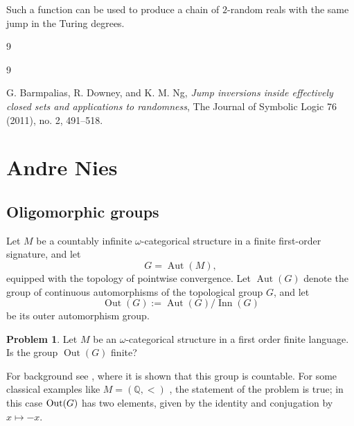 \documentclass[11pt]{amsart}
\theoremstyle{definition}
\newtheorem{problem}{Problem}[section]
\newcommand{\abstractauthor}[1]{\noindent\textbf{#1}\par\vspace{0.3\baselineskip}}
\begin{document}
Such a function can be used to produce a chain of $2$-random reals with
the same jump in the Turing degrees.

\vskip -10pt
\begin{bibentry}{9}
\begin{thebibliography}{9}

 G. Barmpalias, R. Downey, and K. M. Ng, 
\textit{Jump inversions inside effectively closed sets and applications to randomness}, 
The Journal of Symbolic Logic 76 (2011), no. 2, 491--518.

\end{thebibliography}
\end{bibentry}






\bigskip
\bigskip





















\section{Andre Nies}
\subsection*{Oligomorphic groups}

Let $M$ be a countably infinite $\omega$-categorical structure in a
finite first-order signature, and let
\[
    G=\operatorname{Aut}(M),
\]
equipped with the topology of pointwise convergence. Let
$\operatorname{Aut}(G)$ denote the group of continuous automorphisms
of the topological group $G$, and let
\[
    \operatorname{Out}(G)
    :=
    \operatorname{Aut}(G)/\operatorname{Inn}(G)
\]
be its outer automorphism group.

\begin{problem}
    Let $M$ be an $\omega$-categorical structure in a first order finite language. Is the group $\operatorname{Out}(G)$  finite?
\end{problem}

For background see \cite{NiesPaolini}, where it is shown that this group is  countable. For some classical examples like $M=(\mathbb{Q},<)$ \cite{Rubin}, the statement of the problem is true; in this case ${\rm Out} (G)$ has two elements, given by the identity and conjugation by $x \mapsto -x$.    
\end{document}
